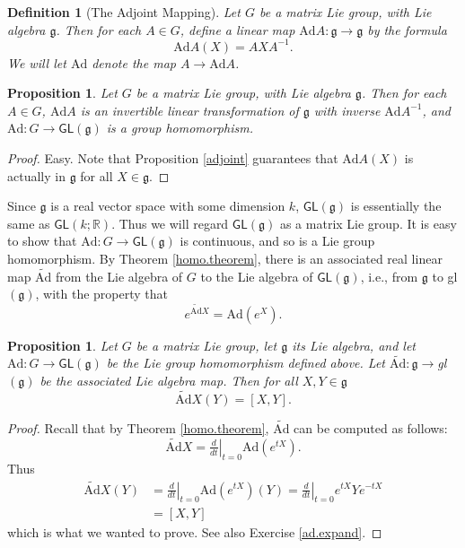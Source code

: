 \documentclass[12pt]{amsbook}
\let \frak = \mathfrak
\theoremstyle{plain}
\newtheorem{definition}[theorem]{Definition}
\newtheorem{proposition}[theorem]{Proposition}
\numberwithin{equation}{chapter}
\numberwithin{theorem}{chapter}
\begin{document}
\begin{definition}
[The Adjoint Mapping]Let $G$ be a matrix Lie group, with Lie algebra
$\frak{g}$. Then for each $A\in G$, define a linear map $\mathrm{Ad}%
A:\frak{g}\rightarrow\frak{g}$ by the formula
\[
\mathrm{Ad}A(X)=AXA^{-1}\text{.}%
\]
We will let $\mathrm{Ad}$ denote the map $A\rightarrow\mathrm{Ad}A$.
\end{definition}

\begin{proposition}
Let $G$ be a matrix Lie group, with Lie algebra $\frak{g}$. Then for each
$A\in G$, $\mathrm{Ad}A$ is an invertible linear transformation of $\frak{g}$
with inverse $\mathrm{Ad}A^{-1}$, and $\mathrm{Ad}:G\rightarrow\mathsf{GL}%
(\frak{g})$ is a group homomorphism.
\end{proposition}

\begin{proof}
Easy. Note that Proposition \ref{adjoint} guarantees that $\mathrm{Ad}A(X)$ is
actually in $\frak{g}$ for all $X\in\frak{g}$.
\end{proof}

Since $\frak{g}$ is a real vector space with some dimension $k$,
$\mathsf{GL}(\frak{g})$ is essentially the same as $\mathsf{GL}(k;\mathbb{R}%
)$. Thus we will regard $\mathsf{GL}(\frak{g})$ as a matrix Lie group. It is
easy to show that $\mathrm{Ad}:G\rightarrow\mathsf{GL}(\frak{g})$ is
continuous, and so is a Lie group homomorphism. By Theorem \ref{homo.theorem},
there is an associated real linear map $\widetilde{\mathrm{Ad}}$ from the Lie
algebra of $G$ to the Lie algebra of $\mathsf{GL}(\frak{g})$, i.e., from
$\frak{g}$ to \textsf{gl}$(\frak{g})$, with the property that
\[
e^{\widetilde{\mathrm{Ad}}X}=\mathrm{Ad}\left(  e^{X}\right)  \text{.}%
\]

\begin{proposition}
\label{differentiate.Ad}Let $G$ be a matrix Lie group, let $\frak{g}$ its Lie
algebra, and let $\mathrm{Ad}:G\rightarrow\mathsf{GL}(\frak{g})$ be the Lie
group homomorphism defined above. Let $\widetilde{\mathrm{Ad}}:\frak{g}%
\rightarrow$\textsf{gl}$(\frak{g})$ be the associated Lie algebra map. Then
for all $X,Y\in\frak{g}$%
\[
\widetilde{\mathrm{Ad}}X(Y)=[X,Y]\text{.}%
\]
\end{proposition}

\begin{proof}
Recall that by Theorem \ref{homo.theorem}, $\widetilde{\mathrm{Ad}}$ can be
computed as follows:
\[
\widetilde{\mathrm{Ad}}X=\left.  \tfrac{d}{dt}\right|  _{t=0}\mathrm{Ad}%
(e^{tX})\text{.}%
\]
Thus
\begin{align*}
\widetilde{\mathrm{Ad}}X(Y)  & =\left.  \tfrac{d}{dt}\right|  _{t=0}%
\mathrm{Ad}(e^{tX})(Y)=\left.  \tfrac{d}{dt}\right|  _{t=0}e^{tX}Ye^{-tX}\\
& =[X,Y]
\end{align*}
which is what we wanted to prove. See also Exercise \ref{ad.expand}.
\end{proof}
\end{document}
